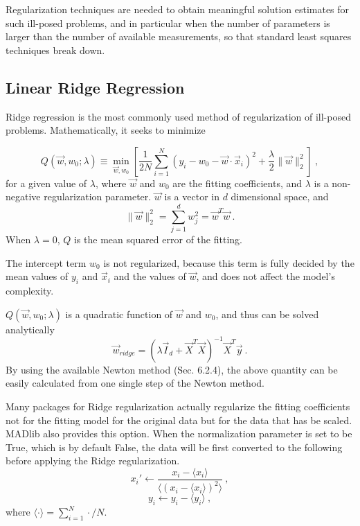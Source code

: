 Regularization techniques are needed to obtain meaningful solution estimates 
for such ill-posed problems, and in particular when the number of parameters 
is larger than the number of available measurements, so that standard least 
squares techniques break down.

\subsection{Linear Ridge Regression}
Ridge regression is the most commonly used method of regularization of
ill-posed problems. Mathematically, it seeks to minimize

\begin{equation}
Q\left(\vec{w},w_0;\lambda\right)\equiv \min_{\vec{w},w_0}\left[ \frac{1}{2N} \sum_{i=1}^{N} \left( y_i - w_0 -
    \vec{w} \cdot \vec{x}_i \right)^2
  +\frac{\lambda}{2}\|\vec{w}\|_2^2 \right]\ ,
\end{equation}
for a given value of $\lambda$, where $\vec{w}$ and $w_0$ are the fitting coefficients, and $\lambda$
is a non-negative regularization parameter. $\vec{w}$ is a vector in
$d$ dimensional space, and
\begin{equation}
\|\vec{w}\|_2^2 = \sum_{j=1}^{d}w_j^2 = \vec{w}^T\vec{w}\ .
\end{equation}
When $\lambda = 0$, $Q$ is
the mean squared error of the fitting.

The intercept term $w_0$ is not regularized, because this term is
fully decided by the mean values of $y_i$ and $\vec{x}_i$ and the
values of $\vec{w}$, and does not affect the model's complexity.

$Q\left(\vec{w},w_0;\lambda\right)$ is a quadratic function of $\vec{w}$ and
  $w_0$, and thus can be solved analytically
\begin{equation}
\vec{w}_{ridge}=\left(\lambda\vec{I}_d +
  \vec{X}^T\vec{X}\right)^{-1}\vec{X}^T\vec{y}\ .
\end{equation}
By using the available Newton method (Sec. 6.2.4), the above quantity can be easily
calculated from one single step of the Newton method.

Many packages for Ridge regularization actually regularize the fitting
coefficients not for the fitting model for the original data but for
the data that has be scaled. MADlib also provides this option. When
the normalization parameter is set to be True, which is by default
False, the data will be first converted to the following before
applying the Ridge regularization.
\begin{equation}
  x_i' \leftarrow \frac{x_i - \langle x_i \rangle}{\langle (x_i -
    \langle x_i \rangle)^2\rangle} \ ,
\end{equation}
\begin{equation}
y_i \leftarrow y_i - \langle y_i \rangle \ ,
\end{equation}
where $\langle \cdot \rangle = \sum_{i=1}^{N} \cdot / N$.

